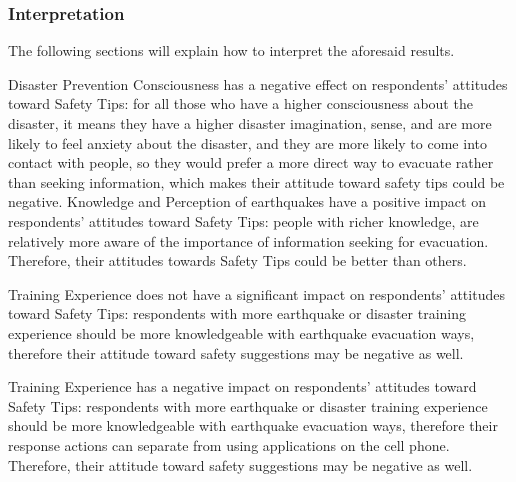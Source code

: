 \subsubsection{Interpretation}
The following sections will explain how to interpret the aforesaid results. 

Disaster Prevention Consciousness has a negative effect on respondents' attitudes toward Safety Tips: for all those who have a higher consciousness about the disaster, it means they have a higher disaster imagination, sense, and are more likely to feel anxiety about the disaster, and they are more likely to come into contact with people, so they would prefer a more direct way to evacuate rather than seeking information, which makes their attitude toward safety tips could be negative.
Knowledge and Perception of earthquakes have a positive impact on respondents' attitudes toward Safety Tips: people with richer knowledge, are relatively more aware of the importance of information seeking for evacuation. Therefore, their attitudes towards Safety Tips could be better than others.

Training Experience does not have a significant impact on respondents' attitudes toward Safety Tips: respondents with more earthquake or disaster training experience should be more knowledgeable with earthquake evacuation ways, therefore their attitude toward safety suggestions may be negative as well. 

Training Experience has a negative impact on respondents' attitudes toward Safety Tips: respondents with more earthquake or disaster training experience should be more knowledgeable with earthquake evacuation ways, therefore their response actions can separate from using applications on the cell phone. Therefore, their attitude toward safety suggestions may be negative as well. 













































